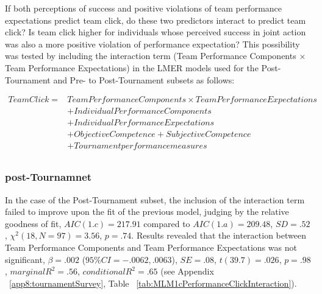 \begin{CJK}{UTF8}{gbsn}
If both perceptions of success and positive violations of team performance expectations predict team click, do these two predictors interact to predict team click?  Is team click higher for individuals whose perceived success in joint action was also a more positive violation of performance expectation?  This possibility was tested by including the interaction term (Team Performance Components $\times$ Team Performance Expectations) in the LMER models used for the Post-Tournament and Pre- to Post-Tournament subsets as follows:


    \begin{align*}
      Team Click =  & Team Performance Components \times Team Performance Expectations \\
                &+ Individual Performance Components \\
                &+ Individual Performance Expectations \\
                &+ Objective Competence + Subjective Competence  \\
                &+ Tournament performance measures \\
    \end{align*}

  \bigskip

  \subsubsection{post-Tournamnet}
  In the case of the Post-Tournament subset, the inclusion of the interaction term failed to improve upon the fit of the previous model, judging by the relative goodness of fit, $AIC(1.c) = 217.91$ compared to $AIC(1.a) = 209.48$, $SD = .52 $, $\chi^2(18, N = 97) = 3.56$, $ p =.74$.
  Results revealed that the interaction between Team Performance Components and Team Performance Expectations was not significant, $\beta = .002$ ($95\% CI =  -.0062, .0063$), $SE = .08$, $t(39.7) = .026$, $p = .98$, $marginal R^2 = .56$, $conditional R^2 = .65$ (see Appendix ~\ref{app8:tournamentSurvey}, Table ~\ref{tab:MLM1cPerformanceClickInteraction}).





\end{CJK}
